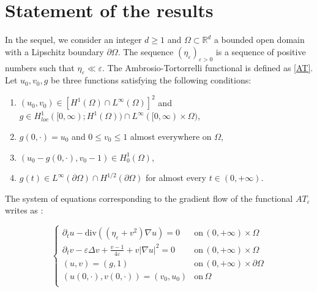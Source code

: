 \documentclass[reqno,12pt,twoside]{amsart}
\numberwithin{equation}{section} \numberwithin{theorem}{section}
\numberwithin{proposition}{section} \numberwithin{lemma}{section}
\numberwithin{corollary}{section}
\numberwithin{definition}{section} \numberwithin{remark}{section}
\begin{document}
%
 
\section{Statement of the results}

In the sequel, we consider an integer $d\geqslant 1$ and $\Omega \subset \mathbb{R}^d$ a bounded open domain with a Lipschitz boundary $\partial\Omega$. The sequence $(\eta_\varepsilon)_{\varepsilon >0}$ is a sequence of positive numbers such that $\eta_\varepsilon \ll\varepsilon$.  
The Ambrosio-Tortorrelli functional is defined as \eqref{AT}.
Let $u_0, v_0 ,g$ be three functions satisfying the following conditions: 

\medskip

\begin{enumerate}[label=(H.\arabic*)]
\item $(u_0,v_0) \in [H^1(\Omega) \cap L^\infty(\Omega)]^2$ and $g\in H_{loc}^1 ([0,\infty) ; H^1(\Omega))\cap L^\infty([0,\infty)\times \Omega)$,
\item $g(0,\cdot) = u_0$ and $0 \leqslant v_0 \leqslant 1$ almost everywhere on $\Omega$,

\item $(u_0 -g(0,\cdot), v_0 -1) \in H_0^1 (\Omega)$,  
\item $g(t)\in L^\infty(\partial\Omega) \cap H^{1/2}(\partial\Omega)$ for almost every $t\in (0,+\infty)$.
\end{enumerate}

\medskip
The system of equations corresponding to the gradient flow of the functional $AT_\varepsilon$ writes as : 

\begin{equation}\label{système de départ}
\left\{\begin{array}{ll}
\partial_t u - \text{div} ((\eta_\varepsilon + v^2) \nabla u) =0 & \text{on} \, (0,+\infty) \times \Omega\\
\partial_t v -  \varepsilon \Delta v + \frac{v-1}{4\varepsilon} + v |\nabla u|^2 =0 &\text{on} \, (0,+\infty) \times \Omega\\
(u,v) =(g,1) &\text{on} \, (0,+\infty) \times \partial\Omega\\
(u(0,\cdot ), v(0, \cdot)) = (v_0, u_0)& \text{on} \, \Omega\\
\end{array}
\right.
\end{equation}
\end{document}
